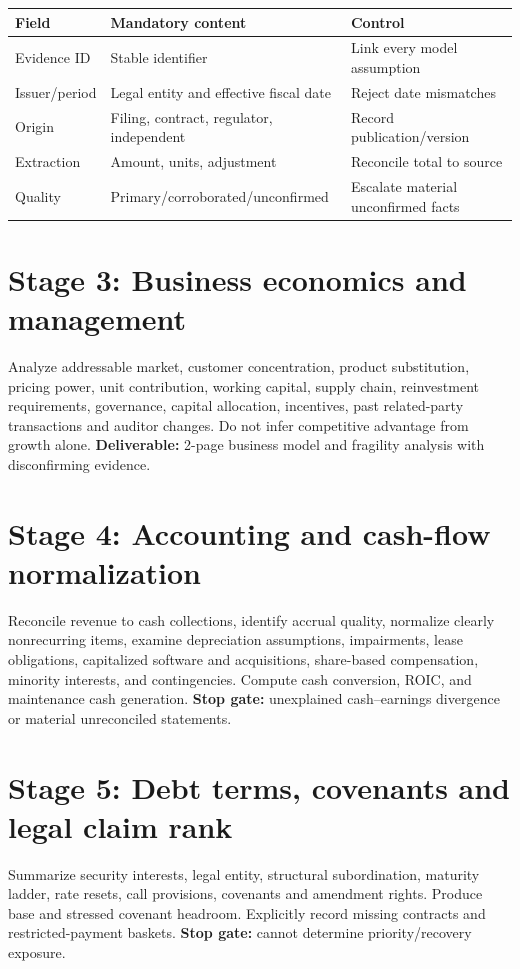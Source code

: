 \documentclass[11pt,letterpaper]{article}
\begin{document}
\begin{center}\small\begin{tabularx}{\textwidth}{p{}X X}\toprule Field & Mandatory content & Control \\
\midrule Evidence ID & Stable identifier & Link every model assumption \\
Issuer/period & Legal entity and effective fiscal date & Reject date mismatches \\
Origin & Filing, contract, regulator, independent & Record publication/version \\
Extraction & Amount, units, adjustment & Reconcile total to source \\
Quality & Primary/corroborated/unconfirmed & Escalate material unconfirmed facts \\
\bottomrule\end{tabularx}\end{center}

\section{Stage 3: Business economics and management}
Analyze addressable market, customer concentration, product substitution, pricing power, unit contribution, working capital, supply chain, reinvestment requirements, governance, capital allocation, incentives, past related-party transactions and auditor changes. Do not infer competitive advantage from growth alone. \textbf{Deliverable:} 2-page business model and fragility analysis with disconfirming evidence.

\section{Stage 4: Accounting and cash-flow normalization}
Reconcile revenue to cash collections, identify accrual quality, normalize clearly nonrecurring items, examine depreciation assumptions, impairments, lease obligations, capitalized software and acquisitions, share-based compensation, minority interests, and contingencies. Compute cash conversion, ROIC, and maintenance cash generation. \textbf{Stop gate:} unexplained cash--earnings divergence or material unreconciled statements.

\section{Stage 5: Debt terms, covenants and legal claim rank}
Summarize security interests, legal entity, structural subordination, maturity ladder, rate resets, call provisions, covenants and amendment rights. Produce base and stressed covenant headroom. Explicitly record missing contracts and restricted-payment baskets. \textbf{Stop gate:} cannot determine priority/recovery exposure.
\end{document}
